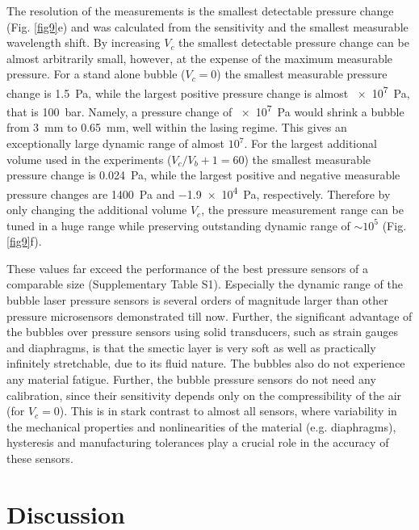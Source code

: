 \documentclass[a4paper,12pt]{article}
\begin{document}
	The resolution of the measurements is the smallest detectable pressure change (Fig. \ref{fig9}e) and was calculated from the sensitivity and the smallest measurable wavelength shift. By increasing $V_c$ the smallest detectable pressure change can be almost arbitrarily small, however, at the expense of the maximum measurable pressure.  For a stand alone bubble ($V_c=0$) the smallest measurable pressure change is \SI{1.5}{Pa}, while the largest positive pressure change is almost \SI{e7}{Pa}, that is \SI{100}{bar}. Namely, a pressure change of \SI{e7}{Pa} would shrink a bubble from \SI{3}{mm} to \SI{0.65}{mm}, well within the lasing regime. This gives an exceptionally large dynamic range of almost $10^7$. For the largest additional volume used in the experiments ($V_c/V_b+1=60$) the smallest measurable pressure change is \SI{0.024}{Pa}, while the largest positive and negative measurable pressure changes are \SI{1400}{Pa} and \SI{-1.9e4}{Pa}, respectively. Therefore by only changing the additional volume $V_c$, the pressure measurement range can be tuned in a huge range while preserving outstanding dynamic range of $\sim10^5$ (Fig. \ref{fig9}f).
	
	
	These values far exceed the performance of the best pressure sensors of a comparable size \cite{sahota2020fiber,vorathin2020review,domingues2018cost,zhu2013graphene,wang2016graphene,javed2019review,lin2018ultra,vsivskins2020sensitive,chen2019ultrahigh} (Supplementary Table S1). Especially the dynamic range of the bubble laser pressure sensors is several orders of magnitude larger than other pressure microsensors demonstrated till now. Further, the significant advantage of the bubbles over pressure sensors using solid transducers, such as strain gauges and diaphragms, is that the smectic layer is very soft as well as practically infinitely stretchable, due to its fluid nature. The bubbles also do not experience any material fatigue. Further, the bubble pressure sensors do not need any calibration, since their sensitivity depends only on the compressibility of the air (for $V_c=0$). This is in stark contrast to almost all sensors, where variability in the mechanical properties and nonlinearities of the material (e.g. diaphragms), hysteresis and manufacturing tolerances play a crucial role in the accuracy of these sensors. 
	
	
	
	\section*{Discussion}
	
\end{document}
